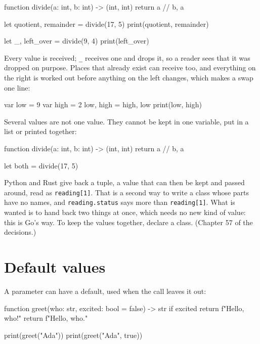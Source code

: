 \begin{zeno}
function divide(a: int, b: int) -> (int, int) {
    return a // b, a %
}

let quotient, remainder = divide(17, 5)
print(quotient, remainder)

let _, left_over = divide(9, 4)
print(left_over)
\end{zeno}

Every value is received; \verb|_| receives one and drops it, so a
reader sees that it was dropped on purpose. Places that already exist
can receive too, and everything on the right is worked out before
anything on the left changes, which makes a swap one line:

\begin{zeno}
var low = 9
var high = 2
low, high = high, low
print(low, high)
\end{zeno}

Several values are not one value. They cannot be kept in one
variable, put in a list or printed together:

\begin{zeno}[fails=yes]
function divide(a: int, b: int) -> (int, int) {
    return a // b, a %
}

let both = divide(17, 5)
\end{zeno}

\begin{why}
Python and Rust give back a tuple, a value that can then be kept and
passed around, read as \verb|reading[1]|. That is a second way to write
a class whose parts have no names, and \verb|reading.status| says more
than \verb|reading[1]|. What is wanted is to hand back two things at
once, which needs no new kind of value: this is Go's way. To keep the
values together, declare a class. (Chapter 57 of the decisions.)
\end{why}

\section{Default values}

A parameter can have a default, used when the call leaves it out:

\begin{zeno}
function greet(who: str, excited: bool = false) -> str {
    if excited {
        return f"Hello, {who}!"
    }
    return f"Hello, {who}."
}

print(greet("Ada"))
print(greet("Ada", true))
\end{zeno}

